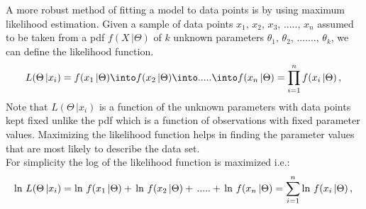 \documentclass{article}
\begin{document}
A more robust method of fitting a model to data points is by using maximum likelihood estimation. Given a sample of data points $x_1,\,x_2,\,x_3,\,.....,\,x_n$ assumed to be taken from a pdf $f(X\,|\Theta)$ of $k$ unknown parameters $\theta_1,\,\theta_2,\,.......,\,\theta_k$, we can define the likelihood function. 
\begin{equation}
L(\Theta\,|x_i) =  f(x_1\,|\Theta)\into f(x_2\,|\Theta) \into .....\into f(x_n\,|\Theta) = \prod_{i=1}^{n} f(x_i\,|\Theta)\,,\\
\end{equation}
Note that $L(\Theta\,|x_i)$ is a function of the unknown parameters with data points kept fixed unlike the pdf which is a function of observations with fixed parameter values. 
Maximizing the likelihood function helps in finding the parameter values that are most likely to describe the data set. \\
For simplicity the log of the likelihood function is maximized i.e.: 
\begin{equation}
\ln\,L(\Theta\,|x_i) =  \ln\,f(x_1\,|\Theta) +\,\ln\,f(x_2\,|\Theta) +\, .....+\,\ln\, f(x_n\,|\Theta) = \sum_{i=1}^{n} \ln\,f(x_i\,|\Theta)\,,\\
\end{equation}
\end{document}
